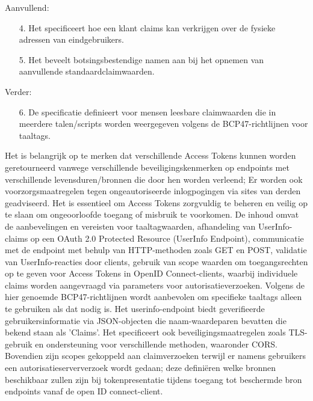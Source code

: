 \newline
Aanvullend:
\begin{enumerate}
  \item[4.] Het specificeert hoe een klant claims kan verkrijgen over de fysieke adressen van eindgebruikers.
  \item[5.] Het beveelt botsingsbestendige namen aan bij het opnemen van aanvullende standaardclaimwaarden.
\end{enumerate}
\newline
Verder:
\begin{enumerate}
  \item[6.] De specificatie definieert voor mensen leesbare claimwaarden die in meerdere talen/scripts worden weergegeven volgens de BCP47-richtlijnen voor taaltags.
\end{enumerate}
\newline
Het is belangrijk op te merken dat verschillende Access Tokens kunnen worden geretourneerd vanwege verschillende beveiligingskenmerken op endpoints met verschillende levensduren/bronnen die door hen worden verleend; Er worden ook voorzorgsmaatregelen tegen ongeautoriseerde inlogpogingen via sites van derden geadviseerd.
\newline
\newline
Het is essentieel om Access Tokens zorgvuldig te beheren en veilig op te slaan om ongeoorloofde toegang of misbruik te voorkomen.
\newline
De inhoud omvat de aanbevelingen en vereisten voor taaltagwaarden, afhandeling van UserInfo-claims op een OAuth 2.0 Protected Resource (UserInfo Endpoint), communicatie met de endpoint met behulp van HTTP-methoden zoals GET en POST, validatie van UserInfo-reacties door clients, gebruik van scope waarden om toegangsrechten op te geven voor Access Tokens in OpenID Connect-clients, waarbij individuele claims worden aangevraagd via parameters voor autorisatieverzoeken.
\newline
Volgens de hier genoemde BCP47-richtlijnen wordt aanbevolen om specifieke taaltags alleen te gebruiken als dat nodig is. Het userinfo-endpoint biedt geverifieerde gebruikersinformatie via JSON-objecten die naam-waardeparen bevatten die bekend staan als 'Claims'. Het specificeert ook beveiligingsmaatregelen zoals TLS-gebruik en ondersteuning voor verschillende methoden, waaronder CORS.
\newline
Bovendien zijn scopes gekoppeld aan claimverzoeken terwijl er namens gebruikers een autorisatieserververzoek wordt gedaan; deze definiëren welke bronnen beschikbaar zullen zijn bij tokenpresentatie tijdens toegang tot beschermde bron endpoints vanaf de open ID connect-client.
